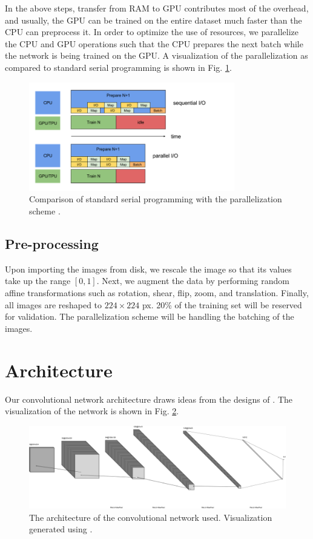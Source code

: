 \documentclass[12pt,a4paper]{article}
\begin{document}
\noindent In the above steps, transfer from RAM to GPU contributes most of the overhead, and usually, the GPU can be trained on the entire dataset much faster than the CPU can preprocess it. In order to optimize the use of resources, we parallelize the CPU and GPU operations such that the CPU prepares the next batch while the network is being trained on the GPU. A visualization of the parallelization as compared to standard serial programming is shown in Fig. \ref{fig:parallelize}.

\begin{figure}[htb]
	\centering
	\includegraphics[width=0.8\textwidth]{parallelize.png}
	\caption{Comparison of standard serial programming with the parallelization scheme \cite{agarwal}.}
	\label{fig:parallelize}
\end{figure}

\subsection{Pre-processing}
Upon importing the images from disk, we rescale the image so that its values take up the range $[0, 1]$. Next, we augment the data by performing random affine transformations such as rotation, shear, flip, zoom, and translation. Finally, all images are reshaped to $224 \times 224$ px. 20\% of the training set will be reserved for validation. The parallelization scheme will be handling the batching of the images.

\section{Architecture}
Our convolutional network architecture draws ideas from the designs of \cite{imagenet, kdnuggets}. The visualization of the network is shown in Fig. \ref{fig:architecture}.

\begin{figure}[htb]
	\centering
	\includegraphics[width=\textwidth]{nn.png}
	\caption{The architecture of the convolutional network used. Visualization generated using \cite{nn-svg}.}
	\label{fig:architecture}
\end{figure}
\end{document}
